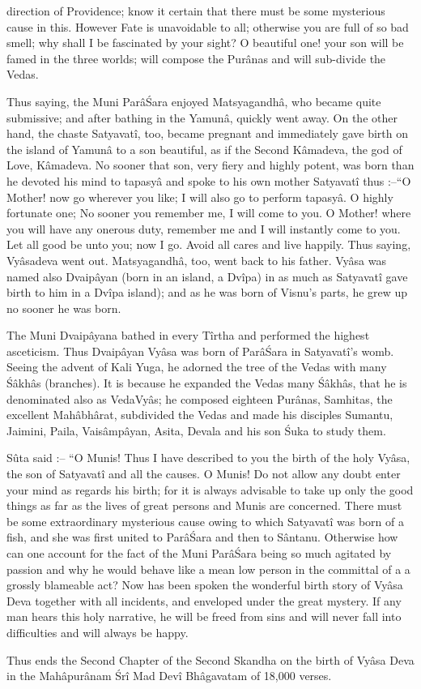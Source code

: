 direction of Providence; know it certain that there must be some mysterious cause in this. However Fate is unavoidable to all; otherwise you are full of so bad smell; why shall I be fascinated by your sight? O beautiful one! your son will be famed in the three worlds; will compose the Pur\^anas and will sub-divide the Vedas.

Thus saying, the Muni Par\^a\'Sara enjoyed Matsyagandh\^a, who became quite submissive; and after bathing in the Yamun\^a, quickly went away. On the other hand, the chaste Satyavat\^i, too, became pregnant and immediately gave birth on the island of Yamun\^a to a son beautiful, as if the Second K\^amadeva, the god of Love, K\^amadeva. No sooner that son, very fiery and highly potent, was born than he devoted his mind to tapasy\^a and spoke to his own mother Satyavat\^i thus :--``O Mother! now go wherever you like; I will also go to perform tapasy\^a. O highly fortunate one; No sooner you remember me, I will come to you. O Mother! where you will have any onerous duty, remember me and I will instantly come to you. Let all good be unto you; now I go. Avoid all cares and live happily. Thus saying, Vy\^asadeva went out. Matsyagandh\^a, too, went back to his father. Vy\^asa was named also Dvaip\^ayan (born in an island, a Dv\^ipa) in as much as Satyavat\^i gave birth to him in a Dv\^ipa island); and as he was born of Visnu's parts, he grew up no sooner he was born.

The Muni Dvaip\^ayana bathed in every T\^irtha and performed the highest asceticism. Thus Dvaip\^ayan Vy\^asa was born of Par\^a\'Sara in Satyavat\^i's womb. Seeing the advent of Kali Yuga, he adorned the tree of the Vedas with many \'S\^akh\^as (branches). It is because he expanded the Vedas many \'S\^akh\^as, that he is denominated also as VedaVy\^as; he composed eighteen Pur\^anas, Samhitas, the excellent Mah\^abh\^arat, subdivided the Vedas and made his disciples Sumantu, Jaimini, Paila, Vais\^amp\^ayan, Asita, Devala and his son \'Suka to study them.

S\^uta said :-- ``O Munis! Thus I have described to you the birth of the holy Vy\^asa, the son of Satyavat\^i and all the causes. O Munis! Do not allow any doubt enter your mind as regards his birth; for it is always advisable to take up only the good things as far as the lives of great persons and Munis are concerned. There must be some extraordinary mysterious cause owing to which Satyavat\^i was born of a fish, and she was first united to Par\^a\'Sara and then to S\^antanu. Otherwise how can one account for the fact of the Muni Par\^a\'Sara being so much agitated by passion and why he would behave like a mean low person in the committal of a a grossly blameable act? Now has been spoken the wonderful birth story of Vy\^asa Deva together with all incidents, and enveloped under the great mystery. If any man hears this holy narrative, he will be freed from sins and will never fall into difficulties and will always be happy.


Thus ends the Second Chapter of the Second Skandha on the birth of Vy\^asa Deva in the Mah\^apur\^anam \'Sr\^i Mad Dev\^i Bh\^agavatam of 18,000 verses.